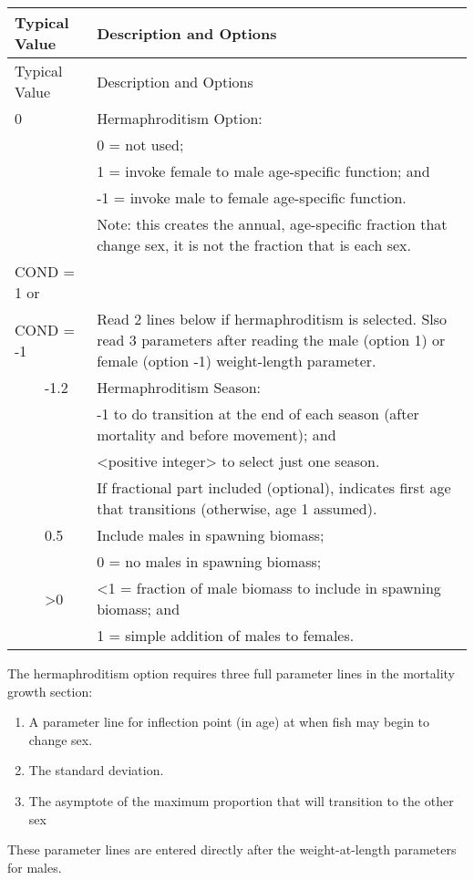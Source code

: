 \begin{longtable}{p{0.5cm} p{2cm} p{13cm}}
	\hline	
	\multicolumn{2}{l}{Typical Value} & Description and Options\Tstrut\Bstrut\\
	\hline
	\endfirsthead

	\hline
	\multicolumn{2}{l}{Typical Value} & Description and Options\Tstrut\Bstrut\\
	\hline
	\endhead
	\hline

	\endfoot
	
	\endlastfoot

	0 & & Hermaphroditism Option:\Tstrut\\
	 &  & 0 = not used; \\
	 &  & 1 = invoke female to male age-specific function; and \\
	 &  & -1 = invoke male to female age-specific function. \\
	 &  & Note:  this creates the annual, age-specific fraction that change sex, it is not the fraction that is each sex.\Bstrut\\
	\hline

	\multicolumn{2}{l}{COND = 1 or} \Tstrut & \\
	\multicolumn{2}{l}{COND = -1}  & Read 2 lines below if hermaphroditism is selected. Slso read 3 parameters after reading the male (option 1) or female (option -1) weight-length parameter.\Bstrut\\
	& -1.2 & Hermaphroditism Season: \\
	&    & -1 to do transition at the end of each season (after mortality and before movement); and\\
	&    & <positive integer> to select just one season.\\
    &	 & If fractional part included (optional), indicates first age that transitions (otherwise, age 1 assumed). \\
	& 0.5 & Include males in spawning biomass;  \\
	&    & 0 = no males in spawning biomass; \\
	& >0  &   <1 = fraction of male biomass to include in spawning biomass; and \\
	&    & 1 = simple addition of males to females. \Bstrut\\
	\hline
\end{longtable}

The hermaphroditism option requires three full parameter lines in the mortality growth section: 
\begin{enumerate}
	\item A parameter line for inflection point (in age) at when fish may begin to change sex.
	\item The standard deviation.
	\item The asymptote of the maximum proportion that will transition to the other sex
\end{enumerate}
These parameter lines are entered directly after the weight-at-length parameters for males.

